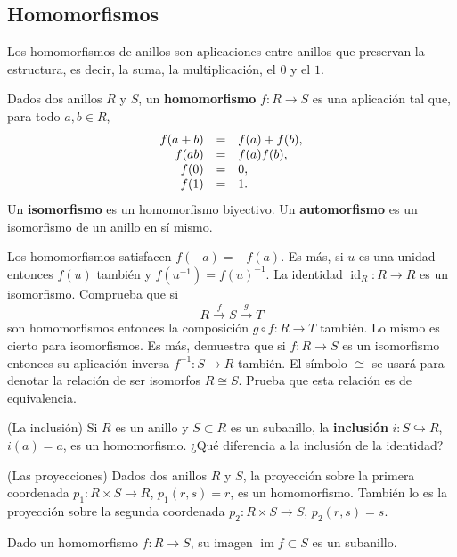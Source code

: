 \hypertarget{homomorfismos}{%
\subsection{Homomorfismos}\label{homomorfismos}}

Los homomorfismos de anillos son aplicaciones entre anillos que
preservan la estructura, es decir, la suma, la multiplicación, el \(0\)
y el \(1\).


Dados dos anillos \(R\) y \(S\), un \textbf{homomorfismo}
\(f\colon R\rightarrow S\) es una aplicación tal que, para todo
\(a,b\in R\),
\[\begin{array}{rcl} f(a+b)&=&f(a)+f(b),\cr f(ab)&=&f(a)f(b),\cr f(0)&=&0,\cr f(1)&=&1.\end{array}\]
Un \textbf{isomorfismo} es un homomorfismo biyectivo. Un
\textbf{automorfismo} es un isomorfismo de un anillo en sí mismo.


Los homomorfismos satisfacen \(f(-a)=-f(a)\). Es más, si \(u\) es una
unidad entonces \(f(u)\) también y \(f(u^{-1})=f(u)^{-1}\). La identidad
\(\operatorname{id}_R\colon R\rightarrow R\) es un isomorfismo.
Comprueba que si
\[R\stackrel{f}\longrightarrow S\stackrel{g}\longrightarrow T\] son
homomorfismos entonces la composición \(g\circ f\colon R\rightarrow T\)
también. Lo mismo es cierto para isomorfismos. Es más, demuestra que si
\(f\colon R\rightarrow S\) es un isomorfismo entonces su aplicación
inversa \(f^{-1}\colon S\rightarrow R\) también. El símbolo \(\cong\) se
usará para denotar la relación de ser isomorfos \(R\cong S\). Prueba que
esta relación es de equivalencia. 

\textrm{\normalfont (La inclusión)} Si \(R\) es un anillo
y \(S\subset R\) es un subanillo, la \textbf{inclusión}
\(i\colon S\hookrightarrow R\), \(i(a)=a\), es un homomorfismo. ¿Qué
diferencia a la inclusión de la identidad? 

\textrm{\normalfont (Las proyecciones)} Dados dos anillos
\(R\) y \(S\), la proyección sobre la primera coordenada
\(p_1\colon R\times S\rightarrow R\), \(p_1(r,s)=r\), es un
homomorfismo. También lo es la proyección sobre la segunda coordenada
\(p_2\colon R\times S\rightarrow S\), \(p_2(r,s)=s\). 


Dado un homomorfismo \(f\colon R\rightarrow S\), su imagen
\(\operatorname{im} f\subset S\) es un subanillo. 

